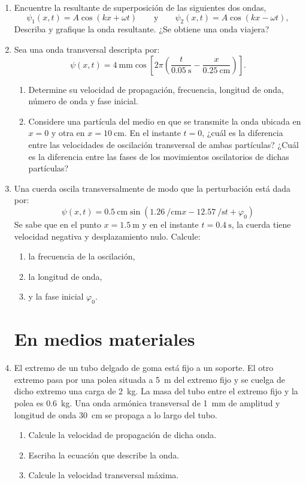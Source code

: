 \documentclass[11pt,spanish,a4paper]{article}
\begin{document}
\begin{enumerate}
\item Encuentre la resultante de superposición de las siguientes dos ondas,
	\[
		\psi_1(x,t)= A \cos \left( k x + \omega t \right) \qquad \mathrm{y} \qquad \psi_2(x,t)= A \cos \left( k x - \omega t \right), 
	\]
	Describa y grafique la onda resultante.
	¿Se obtiene una onda viajera?


\item Sea una onda transversal descripta por:
	\[
	\psi(x,t)= \SI{4}{\milli\metre} \cos \left[ 2 \pi  \left( \frac{t}{\SI{0.05}{\second}} - \frac{x}{\SI{0.25}{\centi\metre}} \right) \right].
	\]
    \begin{enumerate}
        \item Determine su velocidad de propagación, frecuencia, longitud de onda, número de onda y fase inicial.
		\item Considere una partícula del medio en que se transmite la onda ubicada en \(x= 0\) y otra en \(x= \SI{10}{\centi\metre}\). En el instante \(t= 0\), ¿cuál es la diferencia entre las velocidades de oscilación transversal de ambas partículas?
		¿Cuál es la diferencia entre las fases de los movimientos oscilatorios de dichas partículas?
    \end{enumerate}


\item Una cuerda oscila transversalmente de modo que la perturbación está dada por:
	\[
	\psi(x,t)= \SI{0.5}{\centi\metre} \sin \left( \SI{1.26}{\per\centi\metre} x - \SI{12.57}{\per\second} t + \varphi_0 \right) 
	\]
	Se sabe que en el punto \(x= \SI{1.5}{\metre}\) y en el instante \(t= \SI{0.4}{\second}\), la cuerda tiene velocidad negativa y desplazamiento nulo.
	Calcule:
    \begin{enumerate}
		\item la frecuencia de la oscilación,
		\item la longitud de onda,
		\item y la fase inicial \(\varphi_0\).
    \end{enumerate}


\section*{En medios materiales}

\item El extremo de un tubo delgado de goma está fijo a un soporte.
	El otro extremo pasa por una polea situada a \SI{5}{\metre} del extremo fijo y se cuelga de dicho extremo una carga de \SI{2}{\kilo\gram}.
	La masa del tubo entre el extremo fijo y la polea es \SI{0.6}{\kilo\gram}.
	Una onda armónica transversal de \SI{1}{\milli\metre} de amplitud y longitud de onda \SI{30}{\centi\metre} se propaga a lo largo del tubo.
    \begin{enumerate}
		\item Calcule la velocidad de propagación de dicha onda.
		\item Escriba la ecuación que describe la onda.
		\item Calcule la velocidad transversal máxima.
    \end{enumerate}



\end{enumerate}
\end{document}
